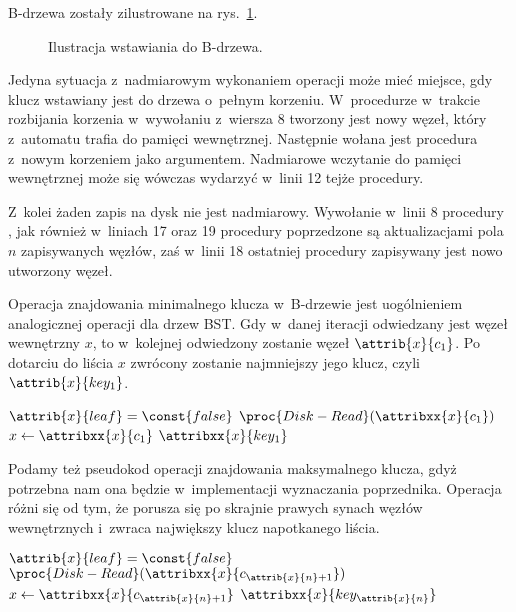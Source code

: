 
\exercise %
B-drzewa zostały zilustrowane na rys.\ \ref{fig:18.2-1}.
\begin{figure}[!ht]
	\centering 
	\caption{Ilustracja wstawiania do B-drzewa.} \label{fig:18.2-1}
\end{figure}

\exercise %
Jedyna sytuacja z~nadmiarowym wykonaniem operacji  może mieć miejsce, gdy klucz wstawiany jest do drzewa o~pełnym korzeniu.
W~procedurze  w~trakcie rozbijania korzenia w~wywołaniu z~wiersza 8 tworzony jest nowy węzeł, który z~automatu trafia do pamięci wewnętrznej.
Następnie wołana jest procedura  z~nowym korzeniem jako argumentem.
Nadmiarowe wczytanie do pamięci wewnętrznej może się wówczas wydarzyć w~linii 12 tejże procedury.

Z~kolei żaden zapis na dysk nie jest nadmiarowy.
Wywołanie  w~linii 8 procedury , jak również w~liniach 17 oraz 19 procedury  poprzedzone są aktualizacjami pola $n$ zapisywanych węzłów, zaś w~linii 18 ostatniej procedury zapisywany jest nowo utworzony węzeł.

\exercise %
Operacja znajdowania minimalnego klucza w~B-drzewie jest uogólnieniem analogicznej operacji dla drzew BST.
Gdy w~danej iteracji odwiedzany jest węzeł wewnętrzny $x$, to w~kolejnej odwiedzony zostanie węzeł $\attrib{x}{c_1}$.
Po dotarciu do liścia $x$ zwrócony zostanie najmniejszy jego klucz, czyli $\attrib{x}{key_1}$.
\begin{codebox}
\li	\While $\attrib{x}{leaf}=\const{false}$
\li		\Do $\proc{Disk-Read}(\attribxx{x}{c_1})$
\li     $x\gets\attribxx{x}{c_1}$
		\End
\li	\Return $\attribxx{x}{key_1}$
\end{codebox}

Podamy też pseudokod operacji znajdowania maksymalnego klucza, gdyż potrzebna nam ona będzie w~implementacji wyznaczania poprzednika.
Operacja różni się od  tym, że porusza się po skrajnie prawych synach węzłów wewnętrznych i~zwraca największy klucz napotkanego liścia.
\begin{codebox}
\li	\While $\attrib{x}{leaf}=\const{false}$
\li		\Do $\proc{Disk-Read}(\attribxx{x}{c_{\attrib{x}{n}+1}})$
\li     $x\gets\attribxx{x}{c_{\attrib{x}{n}+1}}$
		\End
\li	\Return $\attribxx{x}{key_{\attrib{x}{n}}}$
\end{codebox}


